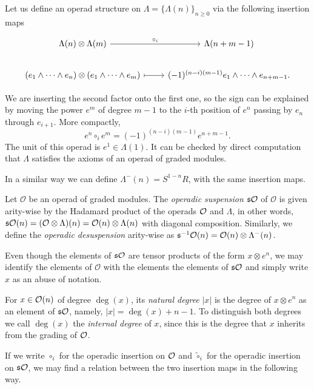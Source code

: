 \documentclass[Thesis.tex]{subfiles}
\begin{document}
Let us define an operad structure on $\Lambda=\{\Lambda(n)\}_{n\geq 0}$ via the following insertion maps

\[
\begin{tikzcd}
\Lambda(n)\otimes\Lambda(m) \arrow[r, "\circ_i"] & \Lambda(n+m-1)\\
(e_1\land\cdots\land e_n)\otimes(e_1\land\cdots\land e_m)\arrow[r, mapsto] & (-1)^{(n-i)(m-1)}e_1\land\cdots\land e_{n+m-1}.
\end{tikzcd}
\]

We are inserting the second factor onto the first one, so the sign can be explained by moving the power $e^m$ of degree $m-1$ to the $i$-th position of $e^n$ passing by $e_{n}$ through $e_{i+1}$. More compactly, \[e^n\circ_i e^m=(-1)^{(n-i)(m-1)}e^{n+m-1}.\] The unit of this operad is $e^1\in\Lambda(1)$. It can be checked by direct computation that $\Lambda$ satisfies the axioms of an operad of graded modules.

In a similar way we can define $\Lambda^-(n)=S^{1-n}R$, with the same insertion maps.

\begin{defin}
Let $\mathcal{O}$ be an operad of graded modules. The \emph{operadic suspension} $\mathfrak{s}{\mathcal O}$ of $\mathcal{O}$ is given arity-wise by the Hadamard product of the operads ${\mathcal O}$ and $\Lambda$, in other words, $\mathfrak{s}{\mathcal O}(n)=(\mathcal{O}\otimes\Lambda)(n)=\mathcal{O}(n)\otimes\Lambda(n)$ with diagonal composition. Similarly, we define the \emph{operadic desuspension} arity-wise as $\mathfrak{s}^{-1}{\mathcal O}(n)=\mathcal{O}(n)\otimes\Lambda^-(n)$.
\end{defin}


Even though the elements of $\mathfrak{s}{\mathcal O}$ are tensor products of the form $x\otimes e^n$, we may identify the elements of $\mathcal{O}$ with the elements the elements of $\mathfrak{s}{\mathcal O}$ and simply write $x$ as an abuse of notation. 

\begin{defin}
For $x\in{\mathcal O}(n)$ of degree $\deg(x)$, its \emph{natural degree} $|x|$ is the degree of $x\otimes e^n$ as an element of $\mathfrak{s}{\mathcal O}$, namely, $|x|=\deg(x)+n-1$. To distinguish both degrees we call $\deg(x)$ the \emph{internal degree} of $x$, since this is the degree that $x$ inherits from the grading of ${\mathcal O}$. 
\end{defin}

If we write $\circ_i$ for the operadic insertion on ${\mathcal O}$ and $\tilde{\circ}_i$ for the operadic insertion on $\mathfrak{s}{\mathcal O}$, we may find a relation between the two insertion maps in the following way. 
\end{document}

